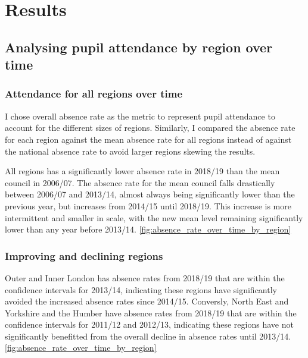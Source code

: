 \documentclass{article}
\begin{document}
\section*{Results}
    \subsection*{Analysing pupil attendance by region over time}
        \subsubsection*{Attendance for all regions over time} 
        I chose overall absence rate as the metric to represent pupil attendance to account for the different sizes of regions. Similarly, I compared the absence rate for each region against the mean absence rate for all regions instead of against the national absence rate to avoid larger regions skewing the results.

        All regions has a significantly lower absence rate in 2018/19 than the mean council in 2006/07. The absence rate for the mean council falls drastically between 2006/07 and 2013/14, almost always being significantly lower than the previous year, but increases from 2014/15 until 2018/19. This increase is more intermittent and smaller in scale, with the new mean level remaining significantly lower than any year before 2013/14. \ref{fig:absence_rate_over_time_by_region}

        \subsubsection*{Improving and declining regions}
        Outer and Inner London has absence rates from 2018/19 that are within the confidence intervals for 2013/14, indicating these regions have significantly avoided the increased absence rates since 2014/15. Conversly, North East and Yorkshire and the Humber have absence rates from 2018/19 that are within the confidence intervals for 2011/12 and 2012/13, indicating these regions have not significantly benefitted from the overall decline in absence rates until 2013/14. \ref{fig:absence_rate_over_time_by_region}
\end{document}
